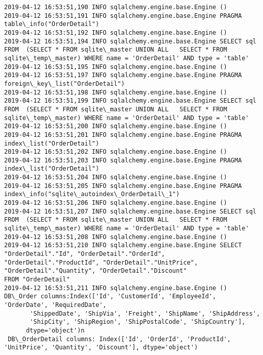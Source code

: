 \documentclass[11pt]{article}
\begin{document}
\begin{Verbatim}[commandchars=\\\{\}]
2019-04-12 16:53:51,190 INFO sqlalchemy.engine.base.Engine ()
2019-04-12 16:53:51,191 INFO sqlalchemy.engine.base.Engine PRAGMA table\_info("OrderDetail")
2019-04-12 16:53:51,192 INFO sqlalchemy.engine.base.Engine ()
2019-04-12 16:53:51,194 INFO sqlalchemy.engine.base.Engine SELECT sql FROM  (SELECT * FROM sqlite\_master UNION ALL   SELECT * FROM sqlite\_temp\_master) WHERE name = 'OrderDetail' AND type = 'table'
2019-04-12 16:53:51,195 INFO sqlalchemy.engine.base.Engine ()
2019-04-12 16:53:51,197 INFO sqlalchemy.engine.base.Engine PRAGMA foreign\_key\_list("OrderDetail")
2019-04-12 16:53:51,198 INFO sqlalchemy.engine.base.Engine ()
2019-04-12 16:53:51,199 INFO sqlalchemy.engine.base.Engine SELECT sql FROM  (SELECT * FROM sqlite\_master UNION ALL   SELECT * FROM sqlite\_temp\_master) WHERE name = 'OrderDetail' AND type = 'table'
2019-04-12 16:53:51,200 INFO sqlalchemy.engine.base.Engine ()
2019-04-12 16:53:51,201 INFO sqlalchemy.engine.base.Engine PRAGMA index\_list("OrderDetail")
2019-04-12 16:53:51,202 INFO sqlalchemy.engine.base.Engine ()
2019-04-12 16:53:51,203 INFO sqlalchemy.engine.base.Engine PRAGMA index\_list("OrderDetail")
2019-04-12 16:53:51,204 INFO sqlalchemy.engine.base.Engine ()
2019-04-12 16:53:51,205 INFO sqlalchemy.engine.base.Engine PRAGMA index\_info("sqlite\_autoindex\_OrderDetail\_1")
2019-04-12 16:53:51,206 INFO sqlalchemy.engine.base.Engine ()
2019-04-12 16:53:51,207 INFO sqlalchemy.engine.base.Engine SELECT sql FROM  (SELECT * FROM sqlite\_master UNION ALL   SELECT * FROM sqlite\_temp\_master) WHERE name = 'OrderDetail' AND type = 'table'
2019-04-12 16:53:51,208 INFO sqlalchemy.engine.base.Engine ()
2019-04-12 16:53:51,210 INFO sqlalchemy.engine.base.Engine SELECT "OrderDetail"."Id", "OrderDetail"."OrderId", "OrderDetail"."ProductId", "OrderDetail"."UnitPrice", "OrderDetail"."Quantity", "OrderDetail"."Discount" 
FROM "OrderDetail"
2019-04-12 16:53:51,211 INFO sqlalchemy.engine.base.Engine ()
DB\_Order columns:Index(['Id', 'CustomerId', 'EmployeeId', 'OrderDate', 'RequiredDate',
       'ShippedDate', 'ShipVia', 'Freight', 'ShipName', 'ShipAddress',
       'ShipCity', 'ShipRegion', 'ShipPostalCode', 'ShipCountry'],
      dtype='object')n
 DB\_OrderDetail columns: Index(['Id', 'OrderId', 'ProductId', 'UnitPrice', 'Quantity', 'Discount'], dtype='object')

    \end{Verbatim}
\end{document}
